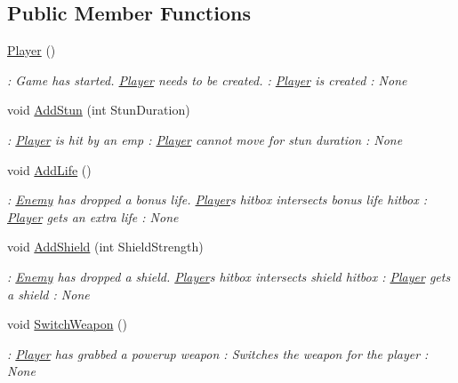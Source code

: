 \subsection*{Public Member Functions}
\begin{DoxyCompactItemize}
\item 
\hyperlink{classXaria_1_1Player_a86d80bfee5af015e8612cd992bf53ad0}{Player} ()
\begin{DoxyCompactList}\small\item\em \+: Game has started. \hyperlink{classXaria_1_1Player}{Player} needs to be created. \+: \hyperlink{classXaria_1_1Player}{Player} is created \+: None \end{DoxyCompactList}\item 
void \hyperlink{classXaria_1_1Player_ad5ad5b8517ebdacc8ed917ab8aaa6b51}{Add\+Stun} (int Stun\+Duration)
\begin{DoxyCompactList}\small\item\em \+: \hyperlink{classXaria_1_1Player}{Player} is hit by an emp \+: \hyperlink{classXaria_1_1Player}{Player} cannot move for stun duration \+: None \end{DoxyCompactList}\item 
void \hyperlink{classXaria_1_1Player_a21b21585a59e7768ba843b8051d99a90}{Add\+Life} ()
\begin{DoxyCompactList}\small\item\em \+: \hyperlink{classXaria_1_1Enemy}{Enemy} has dropped a bonus life. \hyperlink{classXaria_1_1Player}{Player}\textquotesingle{}s hitbox intersects bonus life hitbox \+: \hyperlink{classXaria_1_1Player}{Player} gets an extra life \+: None \end{DoxyCompactList}\item 
void \hyperlink{classXaria_1_1Player_aff15ed23c2465062f0c70e3a2a5e8a86}{Add\+Shield} (int Shield\+Strength)
\begin{DoxyCompactList}\small\item\em \+: \hyperlink{classXaria_1_1Enemy}{Enemy} has dropped a shield. \hyperlink{classXaria_1_1Player}{Player}\textquotesingle{}s hitbox intersects shield hitbox \+: \hyperlink{classXaria_1_1Player}{Player} gets a shield \+: None \end{DoxyCompactList}\item 
void \hyperlink{classXaria_1_1Player_a228a04fe0b09b56bf90bc0a459034bbf}{Switch\+Weapon} ()
\begin{DoxyCompactList}\small\item\em \+: \hyperlink{classXaria_1_1Player}{Player} has grabbed a powerup weapon \+: Switches the weapon for the player \+: None \end{DoxyCompactList}\item 

\end{DoxyCompactItemize}
